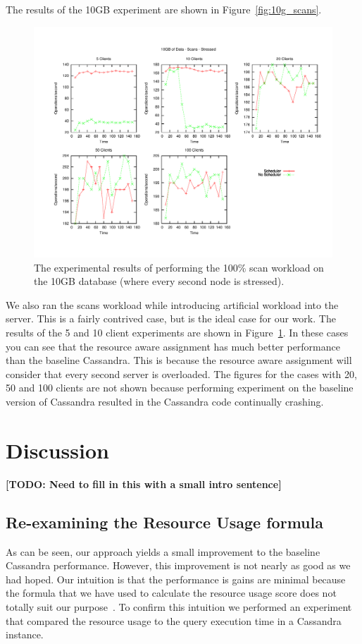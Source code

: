 \documentclass[]{acm_proc_article-sp}
\newcommand{\todo}[1]{\textbf{[TODO: #1]}}
\begin{document}
The results of the 10GB experiment are shown in Figure~\ref{fig:10g_scans}.

\begin{figure}[t]
\centering
\includegraphics[scale=0.63]{images/10GB_Scans_Stressed.pdf}
\vspace{-15pt}
\caption{The experimental results of performing the 100\% scan workload on the 10GB database (where every second node is stressed).}
\label{fig:10g_scans_stressed}
\end{figure}

We also ran the scans workload while introducing artificial workload into the server. This is a fairly contrived case, but is the ideal case for our work. The results of the 5 and 10 client experiments are shown in Figure~\ref{fig:10g_scans_stressed}. In these cases you can see that the resource aware assignment has much better performance than the baseline Cassandra. This is because the resource aware assignment will consider that every second server is overloaded. The figures for the cases with 20, 50 and 100 clients are not shown because performing experiment on the baseline version of Cassandra resulted in the Cassandra code continually crashing.

\section{Discussion}
\todo{Need to fill in this with a small intro sentence}

\subsection{Re-examining the Resource Usage formula}
As can be seen, our approach yields a small improvement to the baseline Cassandra performance. However, this improvement is not nearly as good as we had hoped. Our intuition is that the performance is gains are minimal because the formula that we have used to calculate the resource usage score does not totally suit our purpose~\cite{Gray and Black Box}. To confirm this intuition we performed an experiment that compared the resource usage to the query execution time in a Cassandra instance. 
\end{document}
